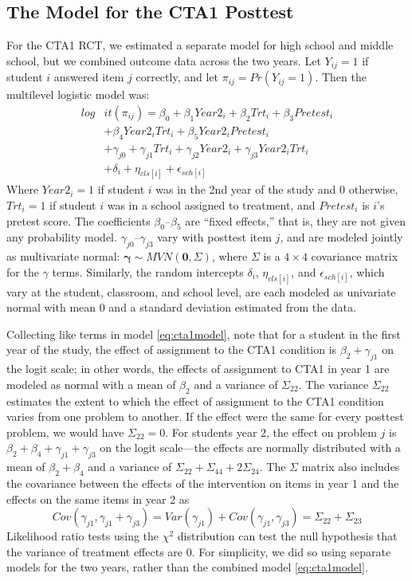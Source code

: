 \documentclass{edm_article}
\begin{document}
\subsection{The Model for the CTA1 Posttest}
For the CTA1 RCT, we estimated a separate model for high school and
middle school, but we combined outcome data across the two years.
Let $Y_{ij}=1$ if student $i$ answered item $j$ correctly, and let
$\pi_{ij}=Pr(Y_{ij}=1)$. Then the multilevel logistic model was:
\begin{equation}\label{eq:cta1model}
  \begin{split}
    log&it(\pi_{ij})=\beta_0+\beta_1Year2_i+\beta_2Trt_i+\beta_3Pretest_i\\
    &+\beta_4Year2_iTrt_i+\beta_5Year2_iPretest_i\\
  &+\gamma_{j0}+\gamma_{j1}Trt_i+\gamma_{j2}Year2_i+\gamma_{j3}Year2_iTrt_i\\
  &+\delta_{i}+\eta_{cls[i]}+\epsilon_{sch[i]}
\end{split}
\end{equation}
Where $Year2_i=1$ if student $i$ was in the 2nd year of the study and
0 otherwise, $Trt_i=1$ if student $i$ was in a school assigned to
treatment, and $Pretest_i$ is $i$'s pretest score.
The coefficients $\beta_0$--$\beta_5$ are ``fixed effects,'' that is,
they are not given any probability model.
$\gamma_{j0}$--$\gamma_{j3}$ vary with posttest item $j$, and are
modeled jointly as multivariate normal: $\bm{\gamma}\sim
MVN(\bm{0},\Sigma)$, where $\Sigma$ is a $4\times 4$ covariance matrix
for the $\gamma$ terms.
Similarly, the random intercepts $\delta_i$, $\eta_{cls[i]}$, and
$\epsilon_{sch[i]}$, which vary at the student, classroom, and school
level, are each modeled as univariate normal with mean 0 and a
standard deviation estimated from the data.

Collecting like terms in model \eqref{eq:cta1model}, note that for a
student in the first year of the study, the effect of assignment to
the CTA1 condition is $\beta_2+\gamma_{j1}$ on the logit scale; in other words, the
effects of assignment to CTA1 in year 1 are modeled as normal with a
mean of $\beta_2$ and a variance of $\Sigma_{22}$.
The variance $\Sigma_{22}$ estimates the extent to which the effect of
assignment to the CTA1 condition varies from one problem to another.
If the effect were the same for every posttest problem, we would have $\Sigma_{22}=0$.
For students year 2, the effect on problem $j$ is
$\beta_2+\beta_4+\gamma_{j1}+\gamma_{j3}$ on the logit scale---the
effects are normally distributed with a mean of $\beta_2+\beta_4$ and
a variance of $\Sigma_{22}+\Sigma_{44}+2\Sigma_{24}$.
The $\Sigma$ matrix also includes the covariance between the effects
of the intervention on items in year 1 and the effects on the same
items in year 2 as
\begin{equation*}
  Cov(\gamma_{j1},\gamma_{j1}+\gamma_{j3})=Var(\gamma_{j1})+Cov(\gamma_{j1},\gamma_{j3})=\Sigma_{22}+\Sigma_{23}
\end{equation*}
Likelihood ratio tests using the $\chi^2$ distribution can test the null hypothesis that the variance of treatment effects
are 0.
For simplicity, we did so using separate models for the two years,
rather than the combined model \eqref{eq:cta1model}.
\end{document}
